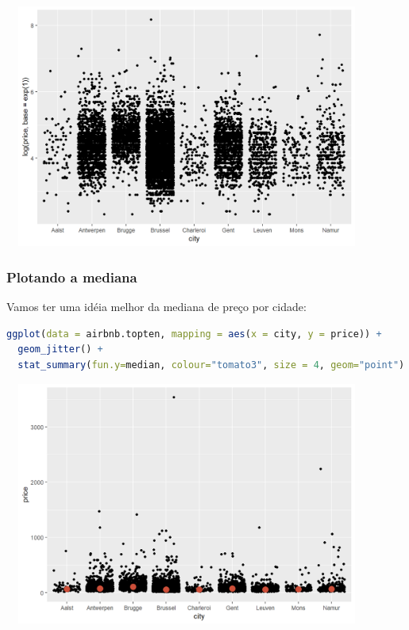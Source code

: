 \documentclass{article}
\begin{document}
\begin{center}
\includegraphics[width=12cm,height=8cm]{intro_log_transform-1.png}
\end{center}

\subsubsection{Plotando a mediana}

Vamos ter uma idéia melhor da mediana de preço por cidade:

\begin{lstlisting}[language=R]
ggplot(data = airbnb.topten, mapping = aes(x = city, y = price)) + 
  geom_jitter() +
  stat_summary(fun.y=median, colour="tomato3", size = 4, geom="point")
\end{lstlisting}

\begin{center}
\includegraphics[width=12cm,height=8cm]{intro_median-1.png}
\end{center}
\end{document}
